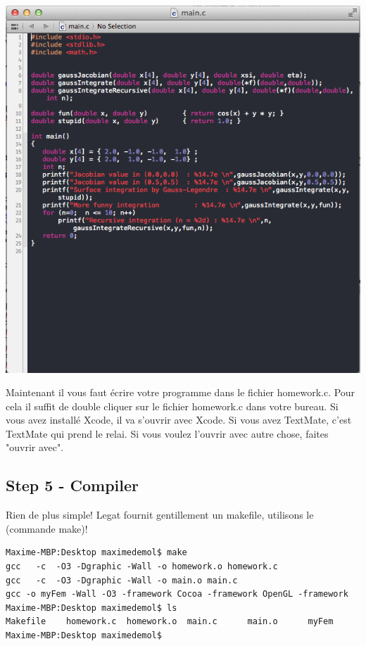 \documentclass[11pt,a4paper]{article}
\begin{document}
\begin{minipage}[c]{.40\linewidth}
\includegraphics[width=\linewidth]{edit.png}
\end{minipage} \hfill
\begin{minipage}[c]{.50\linewidth}
Maintenant il vous faut écrire votre programme dans le fichier homework.c. Pour cela il suffit de double cliquer sur le fichier homework.c dans votre bureau. Si vous avez installé Xcode, il va s'ouvrir avec Xcode. Si vous avez TextMate, c'est TextMate qui prend le relai. Si vous voulez l'ouvrir avec autre chose, faites "ouvrir avec".
\end{minipage}

\subsection{Step 5 - Compiler}

Rien de plus simple! Legat fournit gentillement un makefile, utilisons le (commande make)!

\begin{lstlisting}[style=Bash]
Maxime-MBP:Desktop maximedemol$ make
gcc   -c  -O3 -Dgraphic -Wall -o homework.o homework.c
gcc   -c  -O3 -Dgraphic -Wall -o main.o main.c
gcc -o myFem -Wall -O3 -framework Cocoa -framework OpenGL -framework
Maxime-MBP:Desktop maximedemol$ ls
Makefile	homework.c	homework.o	main.c		main.o		myFem
Maxime-MBP:Desktop maximedemol$ 
\end{lstlisting}
\vspace{12pt}
\end{document}
